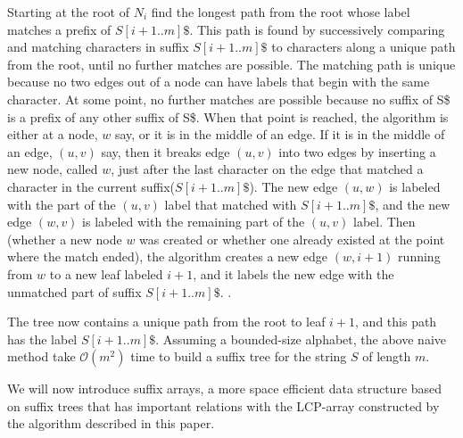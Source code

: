 \documentclass[a4paper,12pt, oneside]{article}
\begin{document}
\begin{displayquote}
Starting at the root of $N_i$ find the longest path from the root whose label matches a prefix of $S[i+1..m]\$$. This path is found by successively comparing and matching characters in suffix $S[i+1..m]\$$ to characters along a unique path from the root, until no further matches are possible. The matching path is unique because no two edges out of a node can have labels that begin with the same character. At some point, no further matches are possible because no suffix of S\$ is a prefix of any other suffix of S\$. When that point is reached, the algorithm is either at a node, $w$ say, or it is in the middle of an edge. If it is in the middle of an edge, $(u, v)$ say, then it breaks edge $(u, v)$ into two edges by inserting a new node, called $w$, just after the last character on the edge that matched a character in the current suffix($S[i+1..m]\$$). The new edge $(u, w)$ is labeled with the part of the $(u, v)$ label that matched with $S[i+1..m]\$$, and the new edge $(w, v)$ is labeled with the remaining part of the $(u, v)$ label. Then (whether a new node $w$ was created or whether one already existed at the point where the match ended), the algorithm creates a new edge $(w, i+1)$ running from $w$ to a new leaf labeled $i+1$, and it labels the new edge with the unmatched part of suffix $S[i+1..m]\$$. \cite{gusfield}.
\end{displayquote}
The tree now contains a unique path from the root to leaf $i+1$, and this path has the label $S[i+1..m]\$$. Assuming a bounded-size alphabet, the above naive method take $\mathcal{O}(m^2)$ time to build a suffix tree for the string $S$ of length $m$.
\par
We will now introduce suffix arrays, a more space efficient data structure based on suffix trees that has important relations with the LCP-array constructed by the algorithm described in this paper.
\end{document}

